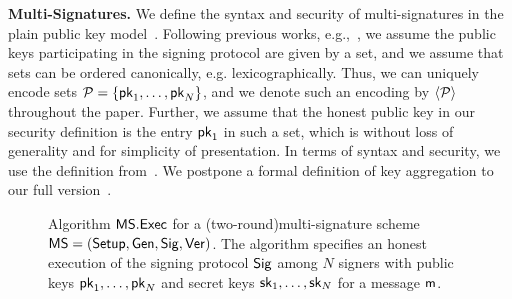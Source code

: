 \documentclass[version=final]{iacrcc}
\theoremstyle{mytheorem}				\newtheorem{theorem}{Theorem}
\theoremstyle{myplain}
\theoremstyle{mydefinition}
\theoremstyle{myremark}
\begin{document}
\smallskip\noindent\textbf{Multi-Signatures.} 
We define the syntax and security of multi-signatures in the plain public key model~\cite{CCS:BelNev06}.
Following previous works, e.g.,~\cite{EPRINT:CriKomMal21,PKC:DOTT21,EC:PanWag23}, we assume the public keys participating in the signing protocol are given by a set, and we assume that sets can be ordered canonically, e.g. lexicographically.
Thus, we can uniquely encode sets ${\mathcal{P}} = \{{\mathsf{pk}}_1,\dots,{\mathsf{pk}}_N\}$, and we denote such an encoding by ${\langle{{\ensuremath{\mathcal{P}}}}\rangle}$ throughout the paper.
Further, we assume that the honest public key in our security definition is the entry ${\mathsf{pk}}_1$ in such a set, which is without loss of generality and for simplicity of presentation.
In terms of syntax and security, we use the definition from~\cite{EC:PanWag23}.
We postpone a formal definition of key aggregation to our full version~\cite{fullversion}.
\begin{figure}[h]
	\centering
	\nicoresetlinenr
	\noindent{}
	\caption{Algorithm ${\mathsf{MS}}.{\mathsf{Exec}}$ for a \ifnum{}(two-round)\fi multi-signature scheme ${\mathsf{MS}} = (\mathsf{Setup},{\mathsf{Gen}},{\mathsf{Sig}},{\mathsf{Ver}})$. The algorithm specifies an honest execution of the signing protocol ${\mathsf{Sig}}$ among $N$ signers with public keys ${\mathsf{pk}}_1,\dots,{\mathsf{pk}}_N$ and secret keys ${\mathsf{sk}}_1,\dots,{\mathsf{sk}}_N$ for a message $\mathsf{m}$.}
	\label{fig:toothpicks:ms:execution}
\end{figure}
\end{document}
